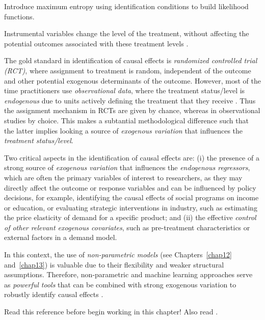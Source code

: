 Introduce maximum entropy using identification conditions to build likelihood functions.

Instrumental variables change the level of the treatment, without affecting the potential outcomes associated with these treatment levels \cite{imbens2014ivperspective}.

The gold standard in identification of causal effects is \textit{randomized controlled trial (RCT)}, where assignment to treatment is random, independent of the outcome and other potential exogenous determinants of the outcome. However, most of the time practitioners use \textit{observational data}, where the treatment status/level is \textit{endogenous} due to units actively defining the treatment that they receive \cite{imbens2014ivperspective}. Thus the assignment mechanism in RCTs are given by chance, whereas in observational studies by choice. This makes a subtantial methodological difference such that the latter implies looking a source of \textit{exogenous variation} that influences the \textit{treatment status/level}.

Two critical aspects in the identification of causal effects are: (i) the presence of a strong source of \textit{exogenous variation} that influences the \textit{endogenous regressors}, which are often the primary variables of interest to researchers, as they may directly affect the outcome or response variables and can be influenced by policy decisions, for example, identifying the causal effects of social programs on income or education, or evaluating strategic interventions in industry, such as estimating the price elasticity of demand for a specific product; and (ii) the effective \textit{control of other relevant exogenous covariates}, such as pre-treatment characteristics or external factors in a demand model.

In this context, the use of \textit{non-parametric models} (see Chapters~\ref{chap12} and~\ref{chap13}) is valuable due to their flexibility and weaker structural assumptions. Therefore, non-parametric and machine learning approaches serve as \textit{powerful tools} that can be combined with strong exogenous variation to robustly identify causal effects \cite{chernozhukov2018double,chernozhukov2024applied}.

Read this reference \cite{iacovone2023bayesian} before begin working in this chapter! Also read \cite{imbens1997bayesian}.


